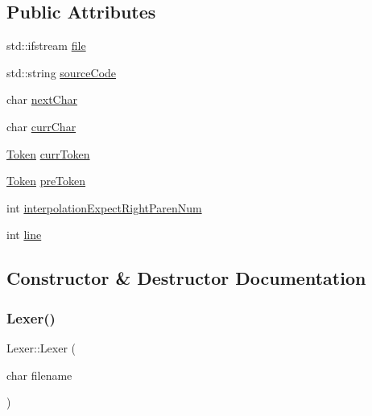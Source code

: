 \subsection*{Public Attributes}
\begin{DoxyCompactItemize}
\item 
std\+::ifstream \mbox{\hyperlink{class_lexer_a4583f270e5eed94ae316ae6c0ea2d1e5}{file}}
\item 
std\+::string \mbox{\hyperlink{class_lexer_a028378af5c43831b7a6dc459ea46c840}{source\+Code}}
\item 
char \mbox{\hyperlink{class_lexer_aae947741e1e4766d1a8028712fe2f266}{next\+Char}}
\item 
char \mbox{\hyperlink{class_lexer_a4ad7e79e52bb27ef561774a8215d1984}{curr\+Char}}
\item 
\mbox{\hyperlink{struct_token}{Token}} \mbox{\hyperlink{class_lexer_a1337226d0cdbf2bf0a9b8e2eb683de90}{curr\+Token}}
\item 
\mbox{\hyperlink{struct_token}{Token}} \mbox{\hyperlink{class_lexer_aaa6452328e54f01df81b4c46c2dafdfc}{pre\+Token}}
\item 
int \mbox{\hyperlink{class_lexer_aa9c1cbb2a3e7e13cdd9a2004db26b2b1}{interpolation\+Expect\+Right\+Paren\+Num}}
\item 
int \mbox{\hyperlink{class_lexer_a35d0802ee5cced4c5294fb6dc77ad2f4}{line}}
\end{DoxyCompactItemize}


\subsection{Constructor \& Destructor Documentation}
\mbox{\label{class_lexer_a90b6530e5beaa58f8109884ebdfe9cf4}} 
\subsubsection{\texorpdfstring{Lexer()}{Lexer()}}
{\footnotesize\ttfamily Lexer\+::\+Lexer (\begin{DoxyParamCaption}\item[{char}]{filename }\end{DoxyParamCaption})}

\mbox{\label{class_lexer_ad26a84af23d8d303723e36e83fc4e556}} 
